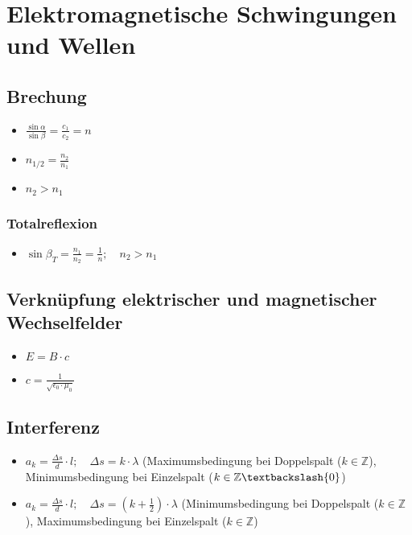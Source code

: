 \documentclass[paper = a4, twocolumn]{scrartcl}
\begin{document}
\section{Elektromagnetische Schwingungen und Wellen}
\subsection{Brechung}
\begin{itemize}
\item
	\( \frac{\sin \alpha}{\sin \beta} = \frac{c_1}{c_2} = n \)
\item
	\( n_{1/2} = \frac{n_2}{n_1} \)
\item
	\( n_2 > n_1 \)
\end{itemize}

\subsubsection{Totalreflexion}
\begin{itemize}
\item
	\( \sin \beta_T = \frac{n_1}{n_2} = \frac{1}{n}; \quad n_2 > n_1 \)
\end{itemize}

\subsection{Verknüpfung elektrischer und magnetischer Wechselfelder}
\begin{itemize}
\item
	\( E = B \cdot c \)
\item
	\( c = \frac{1}{\sqrt{\epsilon_0 \cdot \mu_0}} \)
\end{itemize}

\subsection{Interferenz}
\begin{itemize}
\item
	\( a_k = \frac{\Delta s}{d} \cdot l; \quad \Delta s = k \cdot \lambda \)
	(Maximumsbedingung bei Doppelspalt (\( k \in \mathbb{Z} \)),
	Minimumsbedingung bei Einzelspalt (\( k \in \mathbb{Z}\textbackslash\{0\}
	\))
\item
	\( a_k = \frac{\Delta s}{d} \cdot l; \quad \Delta s = (k + \frac{1}{2})
	\cdot \lambda \) (Minimumsbedingung bei Doppelspalt (\( k \in
	\mathbb{Z} \)), Maximumsbedingung bei Einzelspalt (\( k
	\in \mathbb{Z} \))
\end{itemize}
\end{document}
